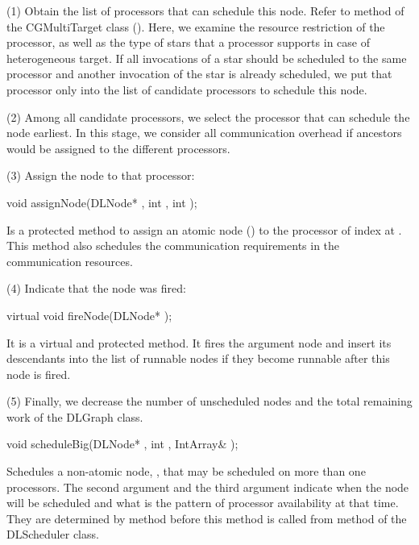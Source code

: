 (1) Obtain the list of processors that can schedule this node. Refer to
 method of the CGMultiTarget
class ().  Here, we
examine the resource restriction of the processor, as well as the type of
stars that a processor supports in case of heterogeneous target. If
all invocations of a star should be scheduled to the same processor and
another invocation of the star is already scheduled, we put that processor only
into the list of candidate processors to schedule this node.

(2) Among all candidate processors, we select the processor that can schedule
the node earliest. In this stage, we consider all communication overhead
if ancestors would be assigned to the different processors.

(3) Assign the node to that processor:

\begin{example}
void assignNode(DLNode* , int , int );
\end{example}

Is a protected method to assign an atomic node () to the processor
of index  at . This method also schedules the
communication requirements in the communication resources.

(4) Indicate that the node was fired:

\begin{example}
virtual void fireNode(DLNode* );
\end{example}

It is a virtual and protected method. It fires the argument node and insert
its descendants into the list of runnable nodes if they become runnable 
after this node is fired.

(5) Finally, we decrease the number of unscheduled nodes and the total
remaining work of the DLGraph class.

\begin{example}
void scheduleBig(DLNode* , int , IntArray& );
\end{example}

Schedules a non-atomic node, , that may be scheduled on more than one
processors. The second argument and the third argument indicate when the
node will be scheduled and what is the pattern of processor availability at
that time. They are determined by  method before this
method is called from  method of the DLScheduler class.

